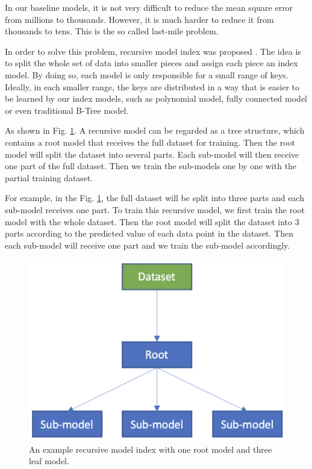 
In our baseline models, it is not very difficult to reduce the mean square error from millions to thousands. However, it is much harder to reduce it from thousands to tens. This is the so called last-mile problem.

In order to solve this problem, recursive model index was proposed \cite{kraska2018case}. The idea is to split the whole set of data into smaller pieces and assign each piece an index model. By doing so, each model is only responsible for a small range of keys. Ideally, in each smaller range, the keys are distributed in a way that is easier to be learned by our index models, such as polynomial model, fully connected model or even traditional B-Tree model.

As shown in Fig. \ref{rmi_structure}. A recursive model can be regarded as a tree structure, which contains a root model that receives the full dataset for training. Then the root model will split the dataset into several parts. Each sub-model will then receive one part of the full dataset. Then we train the sub-models one by one with the partial training dataset. 

\begin{mscexample}
	For example, in the Fig. \ref{rmi_structure}, the full dataset will be split into three parts and each sub-model receives one part. To train this recursive model, we first train the root model with the whole dataset. Then the root model will split the dataset into 3 parts according to the predicted value of each data point in the dataset. Then each sub-model will receive one part and we train the sub-model accordingly.
\end{mscexample}

\begin{figure}[h]
\centering
\includegraphics[scale=0.4]{graphs/implementation/one-dim/rmi_demo.pdf}
\caption{An example recursive model index with one root model and three leaf model.}
\label{rmi_structure}
\end{figure}

